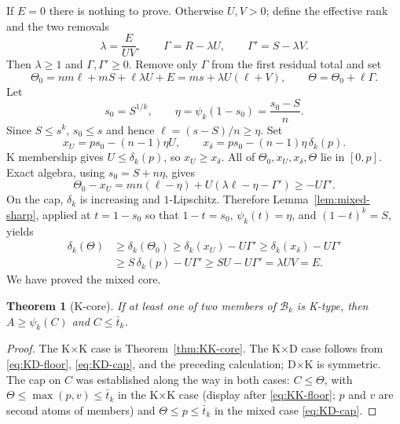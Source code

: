 \documentclass[11pt]{article}
\newtheorem{theorem}{Theorem}[section]
\theoremstyle{definition}
\theoremstyle{remark}
\newcommand{\body}{\mathcal{B}}
\begin{document}
If $E=0$ there is nothing to prove.  Otherwise $U,V>0$; define the
effective rank and the two removals
\begin{equation}\label{eq:KD-parameters}
 \lambda=\frac E{UV},\qquad
 \Gamma=R-\lambda U,\qquad\Gamma'=S-\lambda V.
\end{equation}
Then $\lambda\ge1$ and $\Gamma,\Gamma'\ge0$.  Remove only $\Gamma$ from
the first residual total and set
\begin{equation}\label{eq:KD-T0}
 \Theta_0=nm\ell+mS+\ell\lambda U+E=ms+\lambda U(\ell+V),\qquad
 \Theta=\Theta_0+\ell\Gamma.
\end{equation}
Let
\begin{equation}\label{eq:KD-sharp-factor}
 s_0=S^{1/k},\qquad
 \eta=\psi_k(1-s_0)=\frac{s_0-S}{n}.
\end{equation}
Since $S\le s^k$, $s_0\le s$ and hence $\ell=(s-S)/n\ge\eta$.
Set
\begin{equation}\label{eq:KD-comparison-points}
 x_U=ps_0-(n-1)\eta U,\qquad
 x_\delta=ps_0-(n-1)\eta\,\delta_k(p).
\end{equation}
K membership gives $U\le \delta_k(p)$, so $x_U\ge x_\delta$.  All of
$\Theta_0,x_U,x_\delta,\Theta$ lie in $[0,p]$.  Exact algebra, using
$s_0=S+n\eta$, gives
\begin{equation}\label{eq:KD-cancellation}
 \Theta_0-x_U=mn(\ell-\eta)+U(\lambda \ell-\eta-\Gamma')\ge-U\Gamma'.
\end{equation}
On the cap, $\delta_k$ is increasing and $1$-Lipschitz.  Therefore
Lemma~\ref{lem:mixed-sharp}, applied at $t=1-s_0$ so that $1-t=s_0$,
$\psi_k(t)=\eta$, and $(1-t)^k=S$, yields
\begin{align*}
 \delta_k(\Theta)&\ge\delta_k(\Theta_0)
 \ge\delta_k(x_U)-U\Gamma'
 \ge\delta_k(x_\delta)-U\Gamma'\\
 &\ge S\,\delta_k(p)-U\Gamma'\ge SU-U\Gamma'=\lambda UV=E.
\end{align*}
We have proved the mixed core.

\begin{theorem}[K-core]\label{thm:K-core}
If at least one of two members of $\body_k$ is K-type, then
$A\ge\psi_k(C)$ and $C\le\bar t_k$.
\end{theorem}

\begin{proof}
The K$\times$K case is Theorem~\ref{thm:KK-core}.  The K$\times$D case
follows from \eqref{eq:KD-floor}, \eqref{eq:KD-cap}, and the preceding
calculation; D$\times$K is symmetric.  The cap on $C$ was established
along the way in both cases: $C\le\Theta$, with $\Theta\le\max(p,v)\le
\bar t_k$ in the K$\times$K case (display after \eqref{eq:KK-floor};
$p$ and $v$ are second atoms of members) and $\Theta\le p\le\bar t_k$
in the mixed case \eqref{eq:KD-cap}.
\end{proof}
\end{document}
